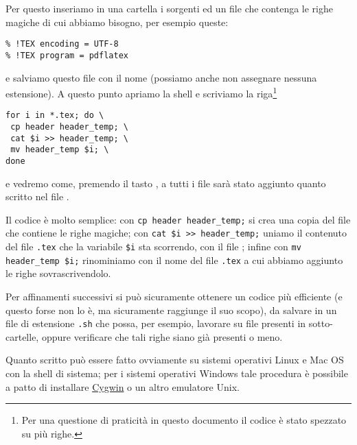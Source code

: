 Per questo inseriamo in una cartella i sorgenti ed un file che contenga le righe
magiche di cui abbiamo bisogno, per esempio queste:
\begin{Verbatim}
% !TEX encoding = UTF-8
% !TEX program = pdflatex
\end{Verbatim}
e salviamo questo file con il nome  (possiamo anche non
assegnare nessuna estensione). A questo punto apriamo la shell e scriviamo la
riga\footnote{Per una questione di praticità in questo documento il codice è
stato spezzato su più righe.}
\begin{Verbatim}
for i in *.tex; do \
 cp header header_temp; \
 cat $i >> header_temp; \
 mv header_temp $i; \
done
\end{Verbatim}
e vedremo come, premendo il tasto \keys{\return}, a tutti i file sarà stato
aggiunto quanto scritto nel file .

Il codice è molto semplice: con \verb!cp header header_temp;! si crea una copia
del file che contiene le righe magiche; con \verb!cat $i >> header_temp;! uniamo
il contenuto del file \texttt{.tex} che la variabile \verb!$i! sta scorrendo,
con il file ; infine con \verb!mv header_temp $i;!
rinominiamo \filestyle{header\_temp} con il nome del file \texttt{.tex} a cui
abbiamo aggiunto le righe sovrascrivendolo.

Per affinamenti successivi si può sicuramente ottenere un codice più efficiente
(e questo forse non lo è, ma sicuramente raggiunge il suo scopo), da salvare in
un file di estensione \texttt{.sh} che possa, per esempio, lavorare su file
presenti in sotto-cartelle, oppure verificare che tali righe siano già presenti
o meno.

Quanto scritto può essere fatto ovviamente su sistemi operativi Linux e Mac OS
con la shell di sistema; per i sistemi operativi Windows tale procedura è
possibile a patto di installare \href{http://www.cygwin.com/}{Cygwin} o un altro
emulatore Unix.


\endinput

\section{Creazione di cartelle ramificate}
\section{Aprire il terminale da una cartella}
\section{Redirezione dei dati}
\section{Operare con i diritti di root}
\section{Scripting}




